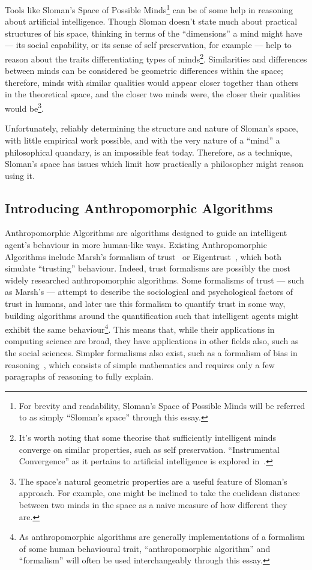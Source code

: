 Tools like Sloman's Space of Possible Minds\footnote{For brevity and readability, Sloman's Space of Possible Minds will be referred to as simply ``Sloman's space'' through this essay.} can be of some help in reasoning about artificial intelligence. Though Sloman doesn't state much about practical structures of his space, thinking in terms of the ``dimensions'' a mind might have --- its social capability, or its sense of self preservation, for example --- help to reason about the traits differentiating types of minds\footnote{It's worth noting that some theorise that sufficiently intelligent minds converge on similar properties, such as self preservation. ``Instrumental Convergence'' as it pertains to artificial intelligence is explored in~\cite{basic_ai_drives}.}. Similarities and differences between minds can be considered be geometric differences within the space; therefore, minds with similar qualities would appear closer together than others in the theoretical space, and the closer two minds were, the closer their qualities would be\footnote{The space's natural geometric properties are a useful feature of Sloman's approach. For example, one might be inclined to take the euclidean distance between two minds in the space as a naive measure of how different they are.}.\par

Unfortunately, reliably determining the structure and nature of Sloman's space, with little empirical work possible, and with the very nature of a ``mind'' a philosophical quandary, is an impossible feat today. Therefore, as a technique, Sloman's space has issues which limit how practically a philosopher might reason using it.\par

\subsection{Introducing Anthropomorphic Algorithms}
Anthropomorphic Algorithms are algorithms designed to guide an intelligent agent's behaviour in more human-like ways. Existing Anthropomorphic Algorithms include Marsh's formalism of trust~\citep{Marsh1994FormalisingConcept} or Eigentrust~\citep{eigentrust}, which both simulate ``trusting'' behaviour. Indeed, trust formalisms are possibly the most widely researched anthropomorphic algorithms. Some formalisms of trust --- such as Marsh's --- attempt to describe the sociological and psychological factors of trust in humans, and later use this formalism to quantify trust in some way, building algorithms around the quantification such that intelligent agents might exhibit the same behaviour\footnote{As anthropomorphic algorithms are generally implementations of a formalism of some human behavioural trait, ``anthropomorphic algorithm'' and ``formalism'' will often be used interchangeably through this essay.}. This means that, while their applications in computing science are broad, they have applications in other fields also, such as the social sciences. Simpler formalisms also exist, such as a formalism of bias in reasoning~\citep{armstrong_bias}, which consists of simple mathematics and requires only a few paragraphs of reasoning to fully explain.\par

